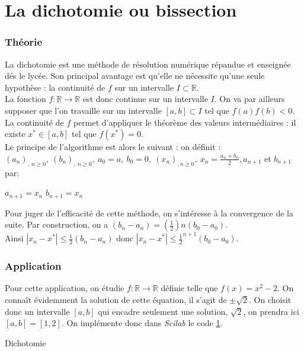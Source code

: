 \documentclass[a4paper,10pt]{report}
\begin{document}
\newpage
\section{La dichotomie ou bissection}
\subsubsection{Théorie}
La dichotomie est une méthode de résolution numérique répandue et enseignée dés le lycée. Son principal avantage est qu'elle ne nécessite qu'une seule hypothèse : la continuité de $f$ sur un intervalle $I\subset \mathbb{R}$.\\
\indent La fonction $f : \mathbb{R} \longrightarrow \mathbb{R}$ est donc continue sur un intervalle $I$. On va par ailleurs supposer que l'on travaille sur un intervalle $[a,b]\subset I$ tel que $f(a)f(b)<0$. La continuité de $f$ permet d'appliquer le théorème des valeurs intermédiaires : il existe $x^{*}\in[a,b]$ tel que $f(x^{*})=0$.\\
\indent Le principe de l'algorithme est alors le suivant : on définit :\\ $(a_{n})_{,\ n \geq 0},\ (b_{n})_{,\ n \geq 0},\ a_{0}=a,\ b_{0}=0,\ (x_{n})_{, n \geq 0},\ x_{n} = \frac{a_{n}+b_{n}}{2}, a_{n+1}$ et $b_{n+1}$ par:

\begin{algorithm}
\begin{algorithmic}
\STATE $a_{n+1}=x_{n}$
\ELSE
\STATE $b_{n+1}=x_{n}$
\ENDIF
\ENDWHILE
\end{algorithmic}
\end{algorithm}

\indent Pour juger de l'efficacité de cette méthode, on s'intéresse à la convergence de la suite. Par construction, on a $(b_{n} - a_{n})=(\frac{1}{2}){n}(b_{0} - a_{0})$.\\
Ainsi $|x_{n} - x^{*}|\leq\frac{1}{2}(b_{n} - a_{n})$ donc $|x_{n} - x^{*}|\leq\frac{1}{2}^{n+1}(b_{0} - a_{0})$.

\subsubsection{Application}
Pour cette application, on étudie $f : \mathbb{R} \longrightarrow \mathbb{R}$ définie telle que $f(x)=x^2-2$. On connaît évidemment la solution de cette équation, il s'agit de $\pm\sqrt{2}$. On choisit donc un intervalle $[a,b]$ qui encadre seulement une solution, $\sqrt{2}$, on prendra ici $[a,b]=[1,2]$. On implémente donc dans \textit{Scilab} le code \ref{dichotomie}.
\begin{table}[H]
\label{dichotomie}
\caption{Dichotomie}
\begin{tabular}{l}
\\
\end{tabular}
\end{table}
\end{document}

